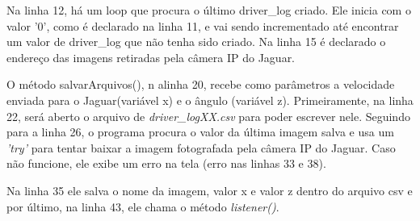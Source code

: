 Na linha 12, há um loop que procura o último driver\_log criado. Ele inicia com o valor '0', como é declarado na linha 11, e vai sendo incrementado até encontrar um valor de driver\_log que não tenha sido criado.
Na linha 15 é declarado o endereço das imagens retiradas pela câmera IP do Jaguar.

	\begin{figure}[H]
		\centering
\end{figure}

O método salvarArquivos(), n alinha 20, recebe como parâmetros a velocidade enviada para o Jaguar(variável x) e o ângulo (variável z). Primeiramente, na linha 22, será aberto o arquivo de \textit{driver\_logXX.csv} para poder escrever nele. Seguindo para a linha 26, o programa procura o valor da última imagem salva e usa um \textit{'try'} para tentar baixar a imagem fotografada pela câmera IP do Jaguar. Caso não funcione, ele exibe um erro na tela (erro nas linhas 33 e 38). 

Na linha 35 ele salva o nome da imagem, valor x e valor z dentro do arquivo csv e por último, na linha 43, ele chama o método \textit{listener()}.

	\begin{figure}[H]
		\centering
\end{figure}

